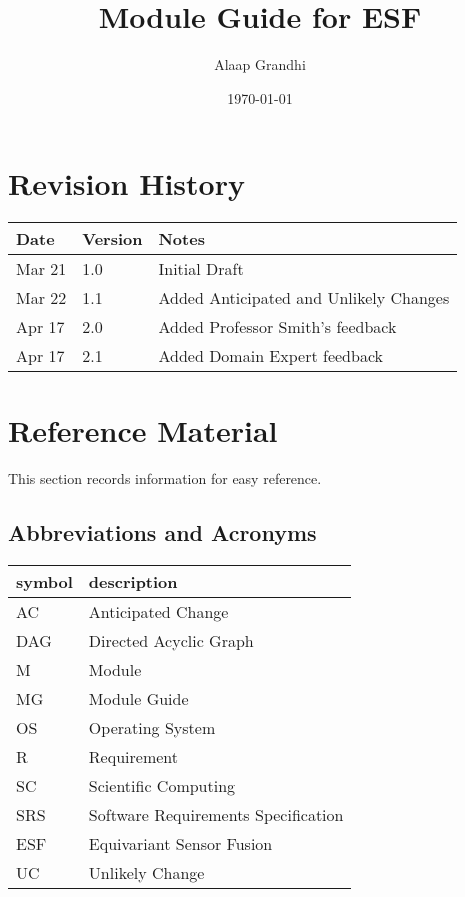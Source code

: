 \documentclass[12pt, titlepage]{article}
\newcommand{\ProjectName}{ESF }
\begin{document}
\title{Module Guide for \ProjectName} 
\author{Alaap Grandhi}
\date{\today}

\maketitle


\section{Revision History}

\begin{tabularx}{\textwidth}{p{3cm}p{2cm}X}
\toprule {\bf Date} & {\bf Version} & {\bf Notes}\\
\midrule
Mar 21 & 1.0 & Initial Draft\\
Mar 22 & 1.1 & Added Anticipated and Unlikely Changes\\
Apr 17 & 2.0 & Added Professor Smith's feedback\\
Apr 17 & 2.1 & Added Domain Expert feedback\\
\bottomrule
\end{tabularx}

\newpage

\section{Reference Material}

This section records information for easy reference.

\subsection{Abbreviations and Acronyms}

\renewcommand{\arraystretch}{1.2}
\begin{tabular}{l l} 
  \toprule		
  \textbf{symbol} & \textbf{description}\\
  \midrule 
  AC & Anticipated Change\\
  DAG & Directed Acyclic Graph \\
  M & Module \\
  MG & Module Guide \\
  OS & Operating System \\
  R & Requirement\\
  SC & Scientific Computing \\
  SRS & Software Requirements Specification\\
  \ProjectName & Equivariant Sensor Fusion\\
  UC & Unlikely Change \\
  \bottomrule
\end{tabular}\\
\end{document}
